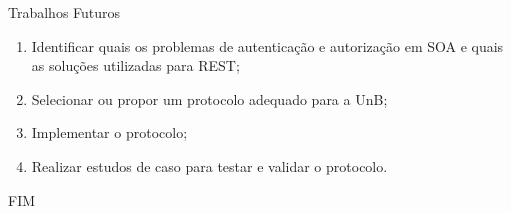 \documentclass[aspectratio=169, newPxFont]{beamer}
\begin{document}
\begin{frame}{Trabalhos Futuros}
	\begin{enumerate}
		\item Identificar quais os problemas de autenticação e autorização em SOA e quais as soluções utilizadas para REST;
		\item Selecionar ou propor um protocolo adequado para a UnB;
		\item Implementar o protocolo;
		\item Realizar estudos de caso para testar e validar o protocolo.
	\end{enumerate}
\end{frame}

\begin{frame}{FIM}
	\fontsize{30}{\baselineskip} 
\end{frame}
\end{document}
